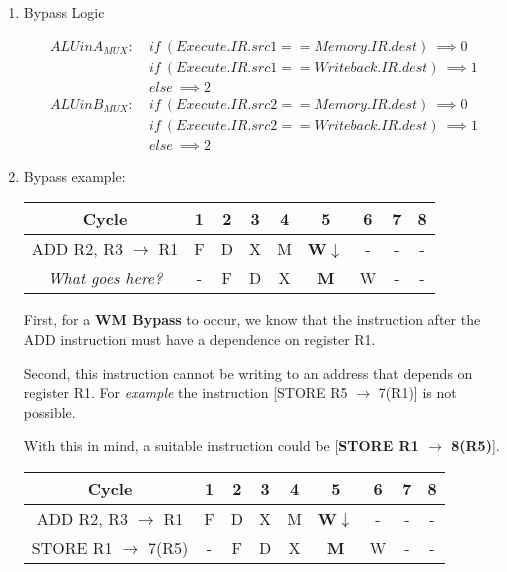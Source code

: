 \documentclass[12pt]{article}
\newenvironment{QandA}{\begin{enumerate}[label=\bfseries\alph*.]\bfseries}
                      {\end{enumerate}}
\newenvironment{answered}{\par\quad\normalfont}{}
\begin{document}
\begin{QandA}
    \item Bypass Logic
    \begin{answered}
        \begin{equation*}
        \begin{split}
        ALUinA_{MUX} : &\ if\ (Execute.IR.src1 == Memory.IR.dest)\ \implies 0\\ &\ if\ (Execute.IR.src1 == Writeback.IR.dest)\ \implies 1\\ &\ else\ \implies 2
        \end{split}
        \end{equation*}
        \begin{equation*}
        \begin{split}
        ALUinB_{MUX} : &\ if\ (Execute.IR.src2 == Memory.IR.dest)\ \implies 0\\ &\ if\ (Execute.IR.src2 == Writeback.IR.dest)\ \implies 1\\ &\ else\ \implies 2
        \end{split}
        \end{equation*}        
    \end{answered}
    
    \item Bypass example:
    \begin{answered}
    \begin{center}
    \begin{tabular}{ |c|c|c|c|c|c|c|c|c| } 
     \hline
     Cycle & 1 & 2 & 3 & 4 & 5 & 6 & 7 & 8 \\ 
     \hline
     ADD R2, R3 $\rightarrow$ R1 & F & D & X & M & \textbf{W}$\downarrow$ & - & - & - \\ 
     \textit{What goes here?} & - & F & D & X & \textbf{M } & W & - & - \\ 
     \hline
    \end{tabular}
    \end{center}
    First, for a \textbf{WM Bypass} to occur, we know that the instruction after the ADD instruction must have a dependence on register R1. 
    
    Second, this instruction cannot be writing to an address that depends on register R1. For \textit{example} the instruction [STORE R5 $\rightarrow$ 7(R1)] is not possible.
    
    With this in mind, a suitable instruction could be [\textbf{STORE R1 $\rightarrow$ 8(R5)}].
    \begin{center}
    \begin{tabular}{ |c|c|c|c|c|c|c|c|c| } 
     \hline
     Cycle & 1 & 2 & 3 & 4 & 5 & 6 & 7 & 8 \\ 
     \hline
     ADD R2, R3 $\rightarrow$ R1 & F & D & X & M & \textbf{W}$\downarrow$ & - & - & - \\ 
     STORE R1 $\rightarrow$ 7(R5) & - & F & D & X & \textbf{M } & W & - & - \\ 
     \hline
    \end{tabular}
    \end{center}    
    \end{answered}
    

\end{QandA}
\end{document}
